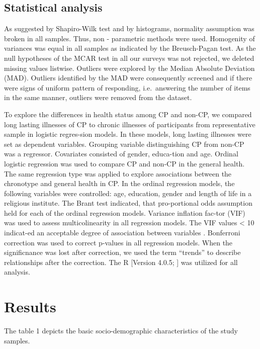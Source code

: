 \documentclass[ijerph,article,accept,moreauthors,pdftex]{mdpi}
\begin{document}
\hypertarget{statistical-analysis}{%
\subsection{Statistical analysis}\label{statistical-analysis}}

As suggested by Shapiro-Wilk test and by histograms, normality
assumption was broken in all samples. Thus, non - parametric methods
were used. Homogenity of variances was equal in all samples as indicated
by the Breusch-Pagan test. As the null hypotheses of the MCAR test in
all our surveys was not rejected, we deleted missing values listwise.
Outliers were explored by the Median Absolute Deviation (MAD). Outliers
identified by the MAD were consequently screened and if there were signs
of uniform pattern of responding, i.e.~answering the number of items in
the same manner, outliers were removed from the dataset.

To explore the differences in health status among CP and non-CP, we
compared long lasting illnesses of CP to chronic illnesses of
participants from representative sample in logistic regres-sion models.
In these models, long lasting illnesses were set as dependent variables.
Grouping variable distinguishing CP from non-CP was a regressor.
Covariates consisted of gender, educa-tion and age. Ordinal logistic
regression was used to compare CP and non-CP in the general health. The
same regression type was applied to explore associations between the
chronotype and general health in CP. In the ordinal regression models,
the following variables were controlled: age, education, gender and
length of life in a religious institute. The Brant test indicated, that
pro-portional odds assumption held for each of the ordinal regression
models. Variance inflation fac-tor (VIF) was used to assess
multicolinearity in all regression models. The VIF values \textless{} 10
indicat-ed an acceptable degree of association between variables
\citep{TAY2017}. Bonferroni correction was used to correct p-values in
all regression models. When the significnance was lost after correction,
we used the term ``trends'' to describe relationships after the
correction. The R {[}Version 4.0.5; \citet{R-base}{]} was utilized for
all analysis.

\hypertarget{results}{%
\section{Results}\label{results}}

The table 1 depicts the basic socio-demographic characteristics of the
study samples.
\end{document}
